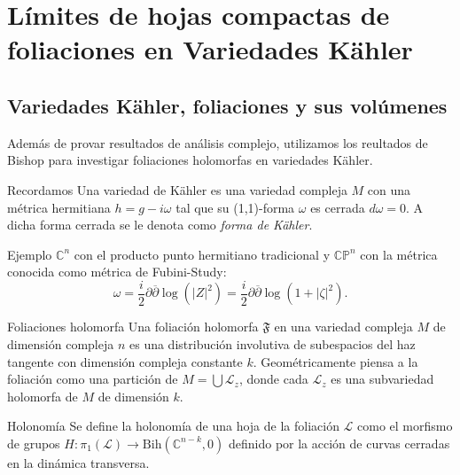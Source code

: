\documentclass[letterpaper]{beamer}
\newcommand{\co}{\ensuremath{\mathbb C }}
\newcommand{\con}{\ensuremath{\mathbb{C}^n}}
\newcommand{\cp}{\ensuremath{\mathbb{CP}}}
\begin{document}
\section{L\'imites de hojas compactas de foliaciones en Variedades K\"ahler}
\subsection{Variedades K\"ahler, foliaciones y sus vol\'umenes}

\begin{frame}
  Además de provar resultados de análisis complejo, utilizamos los reultados de Bishop para investigar foliaciones holomorfas en variedades Kähler.
\begin{block}{Recordamos}
Una variedad de K\"ahler es una variedad compleja $M$ con una métrica hermitiana $h=g-i\omega$ tal que su (1,1)-forma $\omega$ es cerrada $d\omega=0$. A dicha forma cerrada se le denota como \emph{forma de K\"ahler}.
\end{block}
\begin{block}{Ejemplo}
$\con$ con el producto punto hermitiano tradicional y $\cp^{n}$ con la m\'etrica conocida como m\'etrica de Fubini-Study:
\[
    \omega=\frac{i}{2}\partial\overline{\partial}\log(|Z|^{2})=\frac{i}{2}\partial\overline{\partial}\log(1+|\zeta|^{2}).
\]
\end{block}
\end{frame}

\begin{frame}
  \begin{block}{Foliaciones holomorfa}
  Una foliaci\'on holomorfa $\mathfrak{F}$ en una variedad compleja $M$ de dimensi\'on compleja $n$ es una distribuci\'on involutiva de
  subespacios del haz tangente con dimensi\'on compleja constante $k$. Geom\'etricamente piensa a la foliaci\'on como una
  partici\'on de $M=\bigcup\mathcal{L}_z$, donde cada $\mathcal{L}_z$ es una subvariedad holomorfa de $M$ de dimensi\'on $k$.
\end{block}

\begin{block}{Holonom\'ia}
  Se define la holonom\'ia de una hoja de la foliaci\'on $\mathcal{L}$ como el morfismo de grupos $H:\pi_{1}(\mathcal{L})
  \rightarrow\textrm{Bih}(\co^{n-k},0)$ definido por la acci\'on de curvas cerradas en la din\'amica transversa.
\end{block}
\end{frame}
\end{document}
